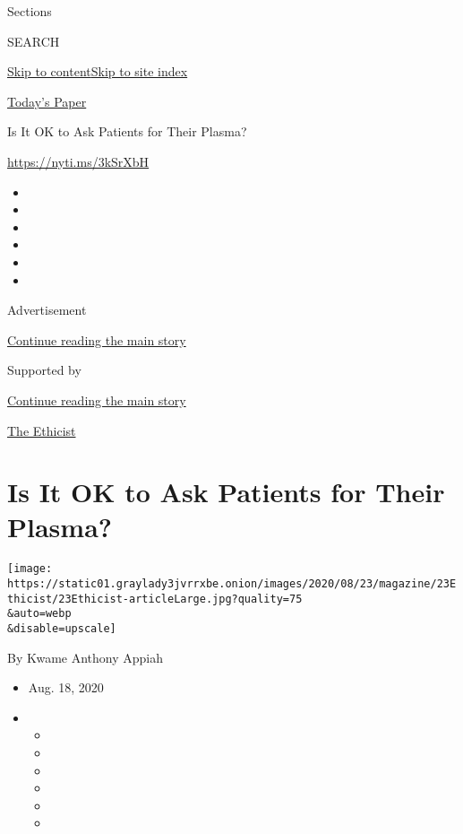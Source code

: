Sections

SEARCH

\protect\hyperlink{site-content}{Skip to
content}\protect\hyperlink{site-index}{Skip to site index}

\href{https://myaccount.nytimes3xbfgragh.onion/auth/login?response_type=cookie\&client_id=vi}{}

\href{https://www.nytimes3xbfgragh.onion/section/todayspaper}{Today's
Paper}

Is It OK to Ask Patients for Their Plasma?

\url{https://nyti.ms/3kSrXbH}

\begin{itemize}
\item
\item
\item
\item
\item
\item
\end{itemize}

Advertisement

\protect\hyperlink{after-top}{Continue reading the main story}

Supported by

\protect\hyperlink{after-sponsor}{Continue reading the main story}

\href{/column/the-ethicist}{The Ethicist}

\hypertarget{is-it-ok-to-ask-patients-for-their-plasma}{%
\section{Is It OK to Ask Patients for Their
Plasma?}\label{is-it-ok-to-ask-patients-for-their-plasma}}

\texttt{[image: https://static01.graylady3jvrrxbe.onion/images/2020/08/23/magazine/23Ethicist/23Ethicist-articleLarge.jpg?quality=75\\\&auto=webp\\\&disable=upscale]}

By Kwame Anthony Appiah

\begin{itemize}
\item
  Aug. 18, 2020
\item
  \begin{itemize}
  \item
  \item
  \item
  \item
  \item
  \item
  \end{itemize}
\end{itemize}

